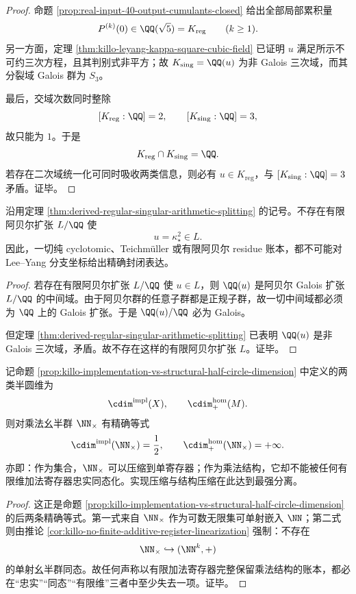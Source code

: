 \begin{proof}
命题 \ref{prop:real-input-40-output-cumulants-closed} 给出全部局部累积量
\[
P^{(k)}(0)\in \QQ(\sqrt5)=K_{\mathrm{reg}}
\qquad (k\ge 1).
\]
另一方面，定理 \ref{thm:killo-leyang-kappa-square-cubic-field} 已证明 \(u\) 满足所示不可约三次方程，且其判别式非平方；故 \(K_{\mathrm{sing}}=\QQ(u)\) 为非 Galois 三次域，而其分裂域 Galois 群为 \(S_3\)。

最后，交域次数同时整除
\[
[K_{\mathrm{reg}}:\QQ]=2,
\qquad
[K_{\mathrm{sing}}:\QQ]=3,
\]
故只能为 \(1\)。于是
\[
K_{\mathrm{reg}}\cap K_{\mathrm{sing}}=\QQ.
\]
若存在二次域统一化可同时吸收两类信息，则必有 \(u\in K_{\mathrm{reg}}\)，与 \([K_{\mathrm{sing}}:\QQ]=3\) 矛盾。证毕。
\end{proof}

\begin{proposition}\label{prop:derived-leyang-no-finite-abelian-ledger}
沿用定理 \ref{thm:derived-regular-singular-arithmetic-splitting} 的记号。不存在有限阿贝尔扩张 \(L/\QQ\) 使
\[
u=\kappa_\star^2\in L.
\]
因此，一切纯 cyclotomic、Teichm\"uller 或有限阿贝尔 residue 账本，都不可能对 Lee--Yang 分支坐标给出精确封闭表达。
\end{proposition}

\begin{proof}
若存在有限阿贝尔扩张 \(L/\QQ\) 使 \(u\in L\)，则 \(\QQ(u)\) 是阿贝尔 Galois 扩张 \(L/\QQ\) 的中间域。由于阿贝尔群的任意子群都是正规子群，故一切中间域都必须为 \(\QQ\) 上的 Galois 扩张。于是 \(\QQ(u)/\QQ\) 必为 Galois。

但定理 \ref{thm:derived-regular-singular-arithmetic-splitting} 已表明 \(\QQ(u)\) 是非 Galois 三次域，矛盾。故不存在这样的有限阿贝尔扩张 \(L\)。证毕。
\end{proof}

\begin{theorem}[乘法对象的实现维与同态维出现最大裂口]\label{thm:derived-multiplicative-implementation-hom-gap}
记命题 \ref{prop:killo-implementation-vs-structural-half-circle-dimension} 中定义的两类半圆维为
\[
\cdim^{\mathrm{impl}}(X),
\qquad
\cdim^{\mathrm{hom}}_{+}(M).
\]
则对乘法幺半群 \(\NN_{\times}\) 有精确等式
\[
\cdim^{\mathrm{impl}}(\NN_{\times})=\frac12,
\qquad
\cdim^{\mathrm{hom}}_{+}(\NN_{\times})=+\infty.
\]
亦即：作为集合，\(\NN_{\times}\) 可以压缩到单寄存器；作为乘法结构，它却不能被任何有限维加法寄存器忠实同态化。实现压缩与结构压缩在此达到最强分离。
\end{theorem}

\begin{proof}
这正是命题 \ref{prop:killo-implementation-vs-structural-half-circle-dimension} 的后两条精确等式。第一式来自 \(\NN_{\times}\) 作为可数无限集可单射嵌入 \(\NN\)；第二式则由推论 \ref{cor:killo-no-finite-additive-register-linearization} 强制：不存在
\[
\NN_{\times}\hookrightarrow (\NN^k,+)
\]
的单射幺半群同态。故任何声称以有限加法寄存器完整保留乘法结构的账本，都必在“忠实”“同态”“有限维”三者中至少失去一项。证毕。
\end{proof}

